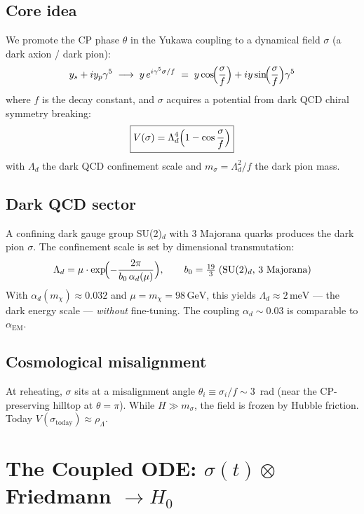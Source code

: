 \documentclass[11pt,a4paper]{article}
\newcommand{\Ld}{\Lambda_d}
\newcommand{\meV}{\,\mathrm{meV}}
\newcommand{\GeV}{\,\mathrm{GeV}}
\begin{document}
\subsection{Core idea}
We promote the CP phase $\theta$ in the Yukawa coupling to a dynamical field $\sigma$ (a dark axion / dark pion):
\begin{equation}\label{eq:promotion}
  y_s + iy_p\gamma^5 \;\longrightarrow\; y\,e^{i\gamma^5\sigma/f}
  \;=\; y\cos\!\Bigl(\frac{\sigma}{f}\Bigr) + iy\sin\!\Bigl(\frac{\sigma}{f}\Bigr)\gamma^5
\end{equation}
where $f$ is the decay constant, and $\sigma$ acquires a potential from dark QCD chiral symmetry breaking:
\begin{equation}\label{eq:potential}
  \boxed{V(\sigma) = \Ld^4\Bigl(1 - \cos\frac{\sigma}{f}\Bigr)}
\end{equation}
with $\Ld$ the dark QCD confinement scale and $m_\sigma = \Ld^2/f$ the dark pion mass.

\subsection{Dark QCD sector}
A confining dark gauge group SU(2)$_d$ with 3 Majorana quarks produces the dark pion $\sigma$.
The confinement scale is set by dimensional transmutation:
\begin{equation}\label{eq:transmutation}
  \Ld = \mu\cdot\exp\!\Bigl(-\frac{2\pi}{b_0\,\alpha_d(\mu)}\Bigr),
  \qquad b_0 = \tfrac{19}{3}\;\text{(SU(2)$_d$, 3 Majorana)}
\end{equation}
With $\alpha_d(m_\chi)\approx0.032$ and $\mu=m_\chi=98\GeV$, this yields $\Ld\approx2\meV$ ---
the dark energy scale --- \emph{without} fine-tuning. The coupling $\alpha_d\sim 0.03$ is comparable to $\alpha_{\mathrm{EM}}$.

\subsection{Cosmological misalignment}
At reheating, $\sigma$ sits at a misalignment angle $\theta_i \equiv \sigma_i/f \sim 3$~rad (near the CP-preserving hilltop at $\theta=\pi$). While $H\gg m_\sigma$, the field is frozen by Hubble friction. Today $V(\sigma_{\mathrm{today}})\approx\rho_\Lambda$.

\section{The Coupled ODE: $\sigma(t)\otimes$Friedmann $\to H_0$}
\end{document}
